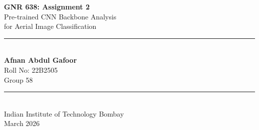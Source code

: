 \documentclass[11pt, a4paper]{article}
\begin{document}
\begin{titlepage}
    \centering
    \vspace*{2cm}
    
    {\Huge\bfseries\color{iitbblue} GNR 638: Assignment 2}\\[0.5cm]
    {\LARGE\color{sectionblue} Pre-trained CNN Backbone Analysis\\for Aerial Image Classification}\\[2cm]
    
    \rule{0.6\textwidth}{1pt}\\[1cm]
    
    {\Large\bfseries Afnan Abdul Gafoor}\\[0.3cm]
    {\large Roll No: 22B2505}\\[0.3cm]
    {\large Group 58}\\[1.5cm]
    
    \rule{0.6\textwidth}{1pt}\\[1cm]
    
    {
    Indian Institute of Technology Bombay}\\[0.5cm]
    {\large March 2026}\\[2cm]
    
    \vfill
    
    \begin{abstract}
    \noindent This report presents a systematic analysis of three pre-trained CNN backbones (\textbf{ResNet50}, \textbf{DenseNet121}, and \textbf{EfficientNet-B0}) on the Aerial Image Dataset (AID) for 30-class land-use classification. We conduct controlled experiments across five scenarios: linear probe transfer, fine-tuning strategies, few-shot learning, corruption robustness, and layer-wise feature probing. Our analysis reveals that DenseNet121 consistently outperforms the other architectures in transfer learning, data efficiency, and corruption robustness, while all three models achieve $\sim$97\% accuracy under full fine-tuning. We provide detailed analysis of representation quality across network depths, gradient dynamics under different training regimes, and robustness under distribution shifts.
    \end{abstract}
\end{titlepage}

\tableofcontents
\newpage

\end{document}

